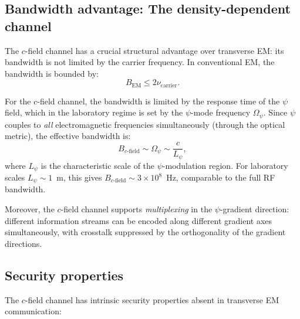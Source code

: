\documentclass[aps,prd,twocolumn,superscriptaddress,nofootinbib,floatfix]{revtex4-2}
\newcommand{\psifield}{\psi}
\newcommand{\cvac}{c}
\newcommand{\ee}[1]{\times 10^{#1}}
\begin{document}
\subsection{Bandwidth advantage: The density-dependent channel}

The $c$-field channel has a crucial structural advantage over
transverse EM: its bandwidth is not limited by the carrier
frequency. In conventional EM, the bandwidth is bounded by:
\begin{equation}
B_{\text{EM}} \leq 2\nu_{\text{carrier}}.
\label{eq:EM_bandwidth_limit}
\end{equation}

For the $c$-field channel, the bandwidth is limited by the
response time of the $\psifield$ field, which in the laboratory
regime is set by the $\psifield$-mode frequency $\Omega_\psi$.
Since $\psifield$ couples to \emph{all} electromagnetic frequencies
simultaneously (through the optical metric), the effective bandwidth
is:
\begin{equation}
B_{c\text{-field}} \sim \Omega_\psi \sim \frac{\cvac}{L_\psi},
\label{eq:c_bandwidth}
\end{equation}
where $L_\psi$ is the characteristic scale of the
$\psifield$-modulation region. For laboratory scales
$L_\psi \sim 1$~m, this gives $B_{c\text{-field}} \sim 3\ee{8}$~Hz,
comparable to the full RF bandwidth.

Moreover, the $c$-field channel supports \emph{multiplexing} in
the $\psifield$-gradient direction: different information streams
can be encoded along different gradient axes simultaneously, with
crosstalk suppressed by the orthogonality of the gradient
directions.

\subsection{Security properties}

The $c$-field channel has intrinsic security properties absent in
transverse EM communication:
\end{document}
